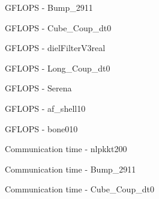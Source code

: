 \begin{figure}[H]
    \centering
    \caption{GFLOPS - Bump\_2911}
    \label{fig:Bump_2911_gflops_multi_rome16q}
\end{figure}

\begin{figure}[H]
    \centering
    \caption{GFLOPS - Cube\_Coup\_dt0}
    \label{fig:Cube_Coup_dt0_gflops_multi_rome16q}
\end{figure}

\begin{figure}[H]
    \centering
    \caption{GFLOPS - dielFilterV3real}
    \label{fig:dielFilterV3real_gflops_multi_rome16q}
\end{figure}

\begin{figure}[H]
    \centering
    \caption{GFLOPS - Long\_Coup\_dt0}
    \label{fig:Long_Coup_dt0_gflops_multi_rome16q}
\end{figure}

\begin{figure}[H]
    \centering
    \caption{GFLOPS - Serena}
    \label{fig:Serena_gflops_multi_rome16q}
\end{figure}

\begin{figure}[H]
    \centering
    \caption{GFLOPS - af\_shell10}
    \label{fig:af_shell10_gflops_multi_rome16q}
\end{figure}

\begin{figure}[H]
    \centering
    \caption{GFLOPS - bone010}
    \label{fig:bone010_gflops_multi_rome16q}
\end{figure}

\begin{figure}[H]
    \centering
    \caption{Communication time - nlpkkt200}
    \label{fig:nlpkkt200_tcomm_multi_rome16q}
\end{figure}

\begin{figure}[H]
    \centering
    \caption{Communication time - Bump\_2911}
    \label{fig:Bump_2911_tcomm_multi_rome16q}
\end{figure}

\begin{figure}[H]
    \centering
    \caption{Communication time - Cube\_Coup\_dt0}
    \label{fig:Cube_Coup_dt0_tcomm_multi_rome16q}
\end{figure}
